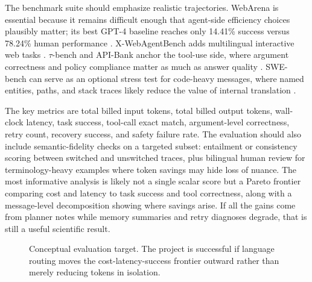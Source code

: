 \documentclass[11pt]{article}
\begin{document}
The benchmark suite should emphasize realistic trajectories. WebArena is essential because it remains difficult enough that agent-side efficiency choices plausibly matter; its best GPT-4 baseline reaches only 14.41\% success versus 78.24\% human performance \cite{yao2023webarena}. X-WebAgentBench adds multilingual interactive web tasks \cite{wang2025xwebagentbench}. $\tau$-bench and API-Bank anchor the tool-use side, where argument correctness and policy compliance matter as much as answer quality \cite{yen2024taubench,li2023apibank}. SWE-bench can serve as an optional stress test for code-heavy messages, where named entities, paths, and stack traces likely reduce the value of internal translation \cite{jimenez2023swebench}.

The key metrics are total billed input tokens, total billed output tokens, wall-clock latency, task success, tool-call exact match, argument-level correctness, retry count, recovery success, and safety failure rate. The evaluation should also include semantic-fidelity checks on a targeted subset: entailment or consistency scoring between switched and unswitched traces, plus bilingual human review for terminology-heavy examples where token savings may hide loss of nuance. The most informative analysis is likely not a single scalar score but a Pareto frontier comparing cost and latency to task success and tool correctness, along with a message-level decomposition showing where savings arise. If all the gains come from planner notes while memory summaries and retry diagnoses degrade, that is still a useful scientific result.

\begin{figure}[t]
\centering
{}
\caption{Conceptual evaluation target. The project is successful if language routing moves the cost-latency-success frontier outward rather than merely reducing tokens in isolation.}
\label{fig:pareto}
\end{figure}
\end{document}
